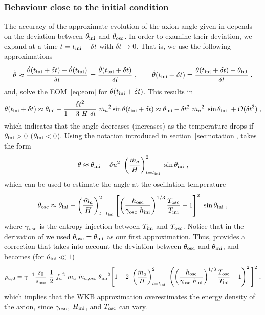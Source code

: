 \documentclass[11pt,a4paper]{article}
\begin{document}
\subsubsection{Behaviour close to the initial condition}\label{sec:close_to_ini}
%
The accuracy of the approximate evolution of the axion angle given in  depends on the deviation between $\theta_{\rm ini}{}$ and $\theta_{\rm osc}{}$. In order to examine their deviation, we expand  at a time $t =t_{\rm ini}{} + \delta t$ with $\delta t \to 0$. That is, we use the following approximations 
%
\begin{equation*}
	\ddot{\theta} \approx \dfrac{\dot \theta (t_{\rm ini}{}+ \delta t)  - \dot \theta (t_{\rm ini}{})}{ \delta  t } =  \dfrac{\dot \theta (t_{\rm ini}{} + \delta t)  }{\delta  t } \;,
	\qquad
	\dot \theta(t_{\rm ini}{} + \delta t) = \dfrac{\theta(t_{\rm ini}{} + \delta t) - \theta_{\rm ini}{}}{\delta t} \;.
\end{equation*} 
%
and, solve the EOM~\ref{eq:eom} for $\theta(t_{\rm ini}{} + \delta t)$. This results in
%
\begin{equation}
	\theta(t_{\rm ini}{} + \delta t)  \approx  \theta_{\rm ini}{} -\dfrac{\delta t^2}{1+3 \ H \ \delta t} \  \tilde m_{a}{}^2  \sin \theta(t_{\rm ini}{} + \delta t)  
	\approx   \theta_{\rm ini}{} - \delta t^2 \ \tilde m_{a}{}^2 \ \sin \theta_{\rm ini}{}  \ + \mathcal{O}(\delta t^3)\;, 
	\label{eq:theta_dt}
\end{equation}
%
which indicates that the angle decreases (increases) as the temperature drops if $\theta_{\rm ini}{}>0$ ($\theta_{\rm ini}{}<0$). Using the notation introduced in section~\ref{sec:notation},  takes the form
%
\begin{eqnarray}
	\theta \approx    \thetai - \delta u^2 \ \lrb{\dfrac{\maT}{H}}_{t=\ti}^2 \ \sin \thetai \;,
	\label{eq:theta_du}
\end{eqnarray}
%
which can be used to estimate the angle at the oscillation temperature
%
\begin{eqnarray}
	\theta_{\rm osc} \approx    \theta_{\rm ini}{} -  \left( \dfrac{\tilde m_{a}{}}{H} \right)_{t=t_{\rm ini}{}}^2 \left[  \left( \dfrac{h_{\rm osc}}{\gamma_{\rm osc} \ h_{\rm ini}} \right)^{1/3} \dfrac{T_{\rm osc}}{T_{\rm ini}} -1  \right] ^{2}   \ \sin \theta_{\rm ini}{} \;,
	\label{eq:theta_osc}
\end{eqnarray}
%
where  $\gamma_{\rm osc}$ is the entropy injection between $T_{\rm ini}{}$ and $T_{\rm osc}{}$. Notice that in the derivation of  we used $\theta_{\rm osc} = \theta_{\rm ini}{}$ as our first approximation. Thus,  provides a correction that takes into account the deviation between $\theta_{\rm osc} $ and $ \theta_{\rm ini}{}$, and  becomes (for $\theta_{\rm ini}{} \ll 1$)
%
\begin{eqnarray}
	\rho_{a,0} = \gamma^{-1}  \dfrac{s_0}{s_{\rm osc}} \  \dfrac{1 }{2}  \ f_{a}{}^2 \ m_{a}{} \ \tilde m_{a}{}_{,{\rm osc}} \ \theta_{\rm ini}{}^2 \Bigg[ 
		1 -2 \ \left( \dfrac{\tilde m_{a}{}}{H} \right)_{t=t_{\rm ini}{}}^2 \  \left( \left( \dfrac{h_{\rm osc}}{\gamma_{\rm osc} \ h_{\rm ini}} \right)^{1/3} \dfrac{T_{\rm osc}}{T_{\rm ini}}-1  \right) ^{2}    \Bigg]^2    \;,
	\label{eq:rho_a_NLO} 
\end{eqnarray}
%
which implies that the WKB approximation overestimates the energy density of the axion, since $\gamma_{\rm osc}$, $H_{\rm ini}$, and $T_{\rm osc}{}$ can vary. 
\end{document}
